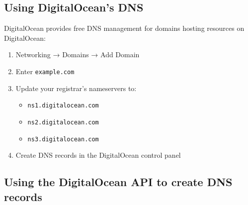 \subsection*{Using DigitalOcean's DNS}\label{27-domain-and-dns:using-digitaloceans-dns}

DigitalOcean provides free DNS management for domains hosting resources on DigitalOcean:

\begin{enumerate}
\def\labelenumi{\arabic{enumi}.}
\tightlist
\item
  Networking → Domains → Add Domain
\item
  Enter \texttt{example.com}
\item
  Update your registrar's nameservers to:

  \begin{itemize}
  \tightlist
  \item
    \texttt{ns1.digitalocean.com}
  \item
    \texttt{ns2.digitalocean.com}
  \item
    \texttt{ns3.digitalocean.com}
  \end{itemize}
\item
  Create DNS records in the DigitalOcean control panel
\end{enumerate}

\subsection*{Using the DigitalOcean API to create DNS records}\label{27-domain-and-dns:using-the-digitalocean-api-to-create-dns-records}

